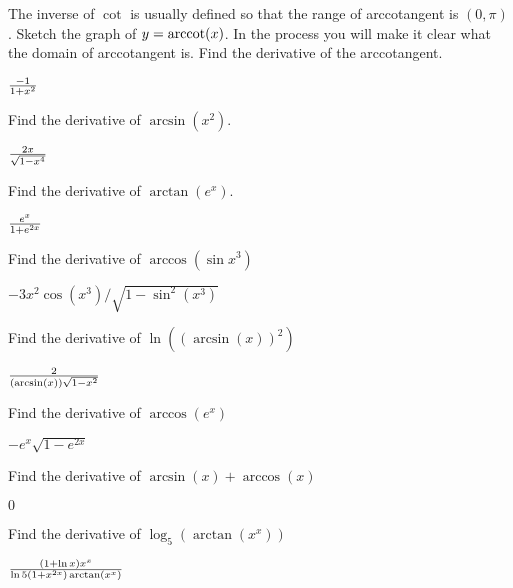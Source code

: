 \begin{exercises}

\begin{exercise} The inverse of $\cot$ is usually defined so that the
 range of arccotangent is $(0, \pi)$.  Sketch the graph of
 $y=\operatorname{arccot}(x)$. In the process you will make it clear what the domain
 of arccotangent is. Find the derivative of the arccotangent.
\begin{answer} ${-1\over 1+x^2}$
\end{answer}\end{exercise}


\begin{exercise} Find the derivative of $\arcsin(x^2)$.
\begin{answer} ${2x\over\sqrt{1-x^4}}$
\end{answer}\end{exercise}

\begin{exercise} Find the derivative of $\arctan(e^x)$.
\begin{answer} ${e^x\over1+e^{2x}}$
\end{answer}\end{exercise}

\begin{exercise} Find the derivative of $\arccos (\sin x^3 )$
\begin{answer} $-3x^2\cos(x^3)/\sqrt{1-\sin^2(x^3)}$
\end{answer}\end{exercise}

\begin{exercise} Find the derivative of $\ln( (\arcsin(x) )^2)$
\begin{answer} ${2\over(\arcsin(x))\sqrt{1-x^2}}$
\end{answer}\end{exercise}

\begin{exercise} Find the derivative of $\arccos(e^x)$
\begin{answer} $-e^x\sqrt{1-e^{2x}}$
\end{answer}\end{exercise}

\begin{exercise} Find the derivative of $\arcsin(x) + \arccos(x)$
\begin{answer} $0$
\end{answer}\end{exercise}

\begin{exercise} Find the derivative of $\log _5 (\arctan (x^x ) )$
\begin{answer} ${(1+\ln x)x^x\over\ln5(1+x^{2x})\arctan(x^x)}$
\end{answer}\end{exercise}

\end{exercises}
